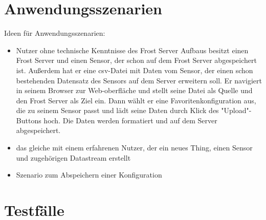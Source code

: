 \documentclass[12 pt]{article}
\begin{document}
	\section{Anwendungsszenarien}
	Ideen für Anwendungsszenarien:
	\begin{itemize}
		\item Nutzer ohne technische Kenntnisse des Frost Server Aufbaus besitzt einen Frost Server und einen Sensor, der schon auf dem Frost Server abgespeichert ist. Außerdem hat er eine csv-Datei mit Daten vom Sensor, der einen schon bestehenden Datensatz des Sensors auf dem Server erweitern soll. Er navigiert in seinem Browser zur Web-oberfläche und stellt seine Datei als Quelle und den Frost Server als Ziel ein. Dann wählt er eine Favoritenkonfiguration aus, die zu seinem Sensor passt und lädt seine Daten durch Klick des "Upload"-Buttons hoch. Die Daten werden formatiert und auf dem Server abgespeichert.
		\item das gleiche mit einem erfahrenen Nutzer, der ein neues Thing, einen Sensor und zugehörigen Datastream erstellt
		\item Szenario zum Abspeichern einer Konfiguration
	\end{itemize}
	
	
	\section{Testfälle}
	
\end{document}
